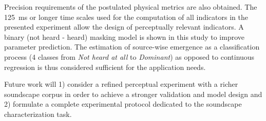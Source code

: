 \documentclass{article}
\begin{document}
\begin{sloppy}
Precision requirements of the postulated physical metrics are also obtained. The 125~ms or longer time scales used for the computation of all indicators in the presented experiment allow the design of perceptually relevant indicators. A binary (not heard - heard) masking model is shown in this study to improve parameter prediction. The estimation of source-wise emergence as a classification process (4 classes from \textit{Not heard at all} to \textit{Dominant}) as opposed to continuous regression is thus considered sufficient for the application needs.

Future work will 1) consider a refined perceptual experiment with a richer soundscape corpus in order to achieve a stronger validation and model design and 2) formulate a complete experimental protocol dedicated to the soundscape characterization task.



%
%
%
%
%
%
%
%
%


\end{sloppy}
\end{document}
